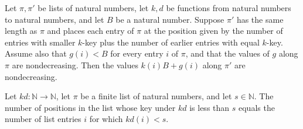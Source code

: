 \begin{theorem}
\label{Light.IsStablePass.sorted}
\leanok
{}
Let $\pi,\pi'$ be lists of natural numbers, let $k,d$ be functions from natural numbers
to natural numbers, and let $B$ be a natural number. Suppose $\pi'$ has the same length
as $\pi$ and places each entry of $\pi$ at the position given by the number of entries
with smaller $k$-key plus the number of earlier entries with equal $k$-key. Assume also
that $g(i)<B$ for every entry $i$ of $\pi$, and that the values of $g$ along $\pi$ are
nondecreasing. Then the values $k(i)B+g(i)$ along $\pi'$ are nondecreasing.
\end{theorem}

\begin{theorem}
\label{Light.cntLt_keyAt}
\leanok
{}
Let $kd:\mathbb{N}\to\mathbb{N}$, let $\pi$ be a finite list of natural numbers, and let
$s\in\mathbb{N}$. The number of positions in the list whose key under $kd$ is less than
$s$ equals the number of list entries $i$ for which $kd(i)<s$.
\end{theorem}
